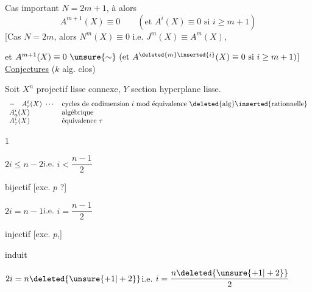 Cas important \(N=2m+1\), à  alors
\[
A^{m+1}(X)\equiv0\qquad(\text{et }A^i(X)\equiv0\text{ si }i\geq m+1)
\]
[Cas \(N=2m\), alors \(N^m(X)\equiv0\) i.e. \(J^m(X)\equiv A^m(X)\),

et \(A^{m+1}(X)\equiv0\ \unsure{\sim}\ (\text{et }A^{\deleted{m}\inserted{i}}(X)\equiv0\text{ si }i\geq m+1)\)]
\uline{Conjectures} \quad(\(k\) alg. clos)

Soit \(X^n\) projectif lisse connexe, \(Y\)  section hyperplane lisse.
\[
\begin{array}{ll}
-\quad A_r^i(X)\ \cdots&\text{cycles de codimension }i\text{ mod équivalence }\deleted{\text{alg}}\inserted{\text{rationnelle}}\\
A_a^i(X)&\text{algébrique}\\
A_\tau^i(X)&\text{équivalence }\tau
\end{array}
\]

\textcircled{1}\quad
{}

\(2i\leq n-2\)\quad i.e.  \(i<\dfrac{n-1}{2}\)

bijectif [exc. \(p\) ?]

\(2i=n-1\)\quad i.e. \(i=\dfrac{n-1}{2}\)

injectif [exc. \(p\),]

induit

\(2i=n\deleted{\unsure{+1|+2}}\)\quad i.e. \(i=\dfrac{n\deleted{\unsure{+1|+2}}}{2}\)

